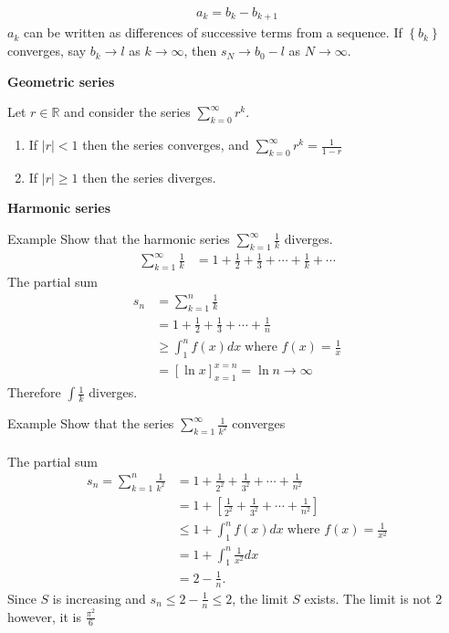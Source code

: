 \documentclass{report}
\begin{document}
		\begin{align*}
			a_k = b_k - b_{k+1}
		\end{align*}
		$a_k$ can be written as differences of successive terms from a sequence. If $\left\{ b_k \right\}$ converges, say $b_k \to l$ as $k \to \infty$, then $s_N \to b_0 - l$ as $N \to \infty$.

	\textbf{Geometric series}

		Let $r \in \mathbb{R}$ and consider the series $\displaystyle\sum_{k=0}^\infty r^k$.
		\begin{enumerate}
			\item If $|r| < 1$ then the series converges, and $\displaystyle\sum_{k=0}^\infty r^k = \frac{1}{1-r}$
			\item If $|r| \geq 1$ then the series diverges.
		\end{enumerate}

	\textbf{Harmonic series}

		\begin{question}{Example}
			Show that the harmonic series $\displaystyle\sum_{k=1}^\infty \frac{1}{k}$ diverges.
			\begin{align*}
				\sum_{k=1}^\infty \frac{1}{k} &= 1 + \frac{1}{2} + \frac{1}{3} + \cdots + \frac{1}{k} + \cdots
			\end{align*}
			The partial sum
			\begin{align*}
				s_n &= \sum_{k=1}^n \frac{1}{k}		\\
					&= 1 + \frac{1}{2} + \frac{1}{3} + \cdots + \frac{1}{n}		\\
					&\geq \int_1^n f(x) dx \; \text{where } f(x) = \frac{1}{x}	\\	
					&= \left[\ln x \right]_{x=1}^{x=n} = \ln n \to \infty
			\end{align*}
			Therefore $\int \frac{1}{k}$ diverges.
		\end{question}

		\begin{question}{Example}
			Show that the series $\displaystyle\sum_{k=1}^\infty \frac{1}{k^2}$ converges
			\\ \\
			The partial sum
			\begin{align*}
				s_n = \sum_{k=1}^n \frac{1}{k^2} &= 1 + \frac{1}{2^2} + \frac{1}{3^2} + \cdots + \frac{1}{n^2}		\\
												 &= 1 + \left[ \frac{1}{2^2} + \frac{1}{3^2} + \cdots + \frac{1}{n^2} \right]	\\
												 &\leq 1 + \int_1^n f(x) dx \; \text{where } f(x) = \frac{1}{x^2}	\\
												 &= 1 + \int_{1}^n \frac{1}{x^2} dx	\\
												 &= 2 - \frac{1}{n}.
			\end{align*}
			Since $S$ is increasing and $s_n \leq 2 - \frac{1}{n} \leq 2$, the limit $S$ exists. The limit is not 2 however, it is $\frac{\pi^2}{6}$
		\end{question}
\end{document}

